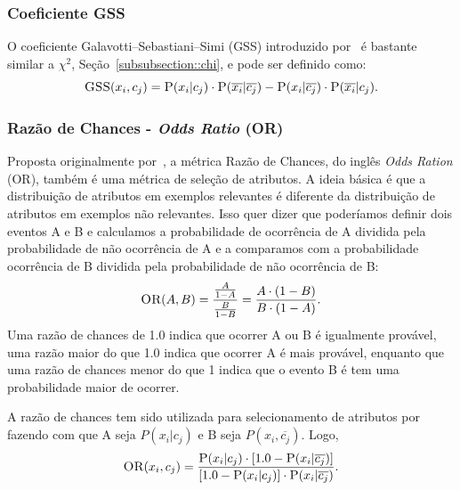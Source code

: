 \subsubsection{Coeficiente GSS}
\label{subsubsection::gss}
O coeficiente Galavotti–Sebastiani–Simi (GSS) introduzido por~\cite{Galavotti00} é bastante similar a $\chi^2$, Seção~\ref{subsubsection::chi}, e pode ser definido como:
\begin{equation}\label{eqn::gss}
   \textsc{GSS}(x_i, c_j) = \textsc{P}(x_i|c_j) \cdot \textsc{P}(\overline{x_i}|\overline{c_j}) - \textsc{P}(x_i|\overline{c_j}) \cdot \textsc{P}(\overline{x_i}|c_j).
\end{equation}


\subsubsection{Razão de Chances - \textit{Odds Ratio} (OR)}
\label{subsubsection::or}

Proposta originalmente por~\cite{Rijsbergen79}, a métrica Razão de Chances, do inglês \textit{Odds Ration} (OR), também é uma métrica de seleção de atributos. A ideia básica é que a distribuição de atributos em exemplos relevantes é diferente da distribuição de atributos em exemplos não relevantes. Isso quer dizer que poderíamos definir dois eventos A e B e calculamos a probabilidade de ocorrência de A dividida pela probabilidade de não ocorrência de A e a comparamos com a probabilidade ocorrência de B dividida pela probabilidade de não ocorrência de B:
\begin{equation}\label{eqn::or}
   \textsc{OR}(A, B) = \frac{\frac{A}{1-A}} {\frac{B}{1-B}} = \frac{ A \cdot ( 1 - B )} { B \cdot ( 1 - A ) } .
\end{equation}
Uma razão de chances de 1.0 indica que ocorrer A ou B é igualmente provável, uma razão maior do que 1.0 indica que ocorrer A é mais provável, enquanto que uma razão de chances menor do que 1 indica que o evento B é tem uma probabilidade maior de ocorrer.

A razão de chances tem sido utilizada para selecionamento de atributos por \cite{Mladenic98} fazendo com que A seja $P(x_i|c_j)$ e B seja $P(x_i,\overline{c_j})$. Logo,
\begin{equation}\label{eqn::or}
   \textsc{OR}(x_i, c_j) = \frac{ \textsc{P}(x_i|c_j) \cdot [ 1.0 - \textsc{P}(x_i|\overline{c_j}) ] }{ [ 1.0 - \textsc{P}(x_i|c_j) ] \cdot \textsc{P}(x_i|\overline{c_j})}.
\end{equation}

